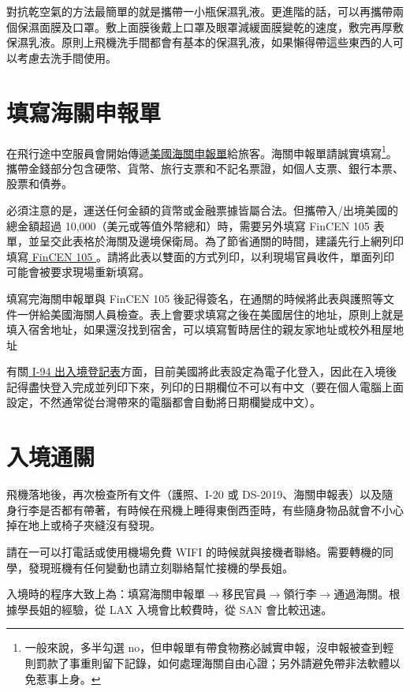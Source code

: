 \documentclass[10pt,a4paper]{book}
\begin{document}
\begin{CJK}{UTF8}{bkai}
對抗乾空氣的方法最簡單的就是攜帶一小瓶保濕乳液。更進階的話，可以再攜帶兩個保濕面膜及口罩。敷上面膜後戴上口罩及眼罩減緩面膜變乾的速度，敷完再厚敷保濕乳液。原則上飛機洗手間都會有基本的保濕乳液，如果懶得帶這些東西的人可以考慮去洗手間使用。

\section{填寫海關申報單}

在飛行途中空服員會開始傳遞\href{http://www.cbp.gov/travel/us-citizens/sample-declaration-form}{美國海關申報單}給旅客。海關申報單請誠實填寫\footnote{一般來說，多半勾選 no，但申報單有帶食物務必誠實申報，沒申報被查到輕則罰款了事重則留下記錄，如何處理海關自由心證；另外請避免帶非法軟體以免惹事上身。 }。攜帶金錢部分包含硬幣、貨幣、旅行支票和不記名票證，如個人支票、銀行本票、股票和債券。

必須注意的是，運送任何金額的貨幣或金融票據皆屬合法。但攜帶入/出境美國的總金額超過 10,000（美元或等值外幣總和）時，需要另外填寫 FinCEN 105 表單，並呈交此表格於海關及邊境保衛局。為了節省通關的時間，建議先行上網列印填寫\href{https://www.fincen.gov/forms/files/fin105_cmir.pdf}{ FinCEN 105 }。請將此表以雙面的方式列印，以利現場官員收件，單面列印可能會被要求現場重新填寫。

填寫完海關申報單與 FinCEN 105 後記得簽名，在通關的時候將此表與護照等文件一併給美國海關人員檢查。表上會要求填寫之後在美國居住的地址，原則上就是填入宿舍地址，如果還沒找到宿舍，可以填寫暫時居住的親友家地址或校外租屋地址

有關\href{https://i94.cbp.dhs.gov/I94/#/home}{ I-94 出入境登記表}方面，目前美國將此表設定為電子化登入，因此在入境後記得盡快登入完成並列印下來，列印的日期欄位不可以有中文（要在個人電腦上面設定，不然通常從台灣帶來的電腦都會自動將日期欄變成中文）。

\section{入境通關}

飛機落地後，再次檢查所有文件（護照、I-20 或 DS-2019、海關申報表）以及隨身行李是否都有帶著，有時候在飛機上睡得東倒西歪時，有些隨身物品就會不小心掉在地上或椅子夾縫沒有發現。

請在一可以打電話或使用機場免費 WIFI 的時候就與接機者聯絡。需要轉機的同學，發現班機有任何變動也請立刻聯絡幫忙接機的學長姐。

入境時的程序大致上為：填寫海關申報單$\rightarrow$移民官員$\rightarrow$領行李$\rightarrow$通過海關。根據學長姐的經驗，從 LAX 入境會比較費時，從 SAN 會比較迅速。


\end{CJK}
\end{document}
